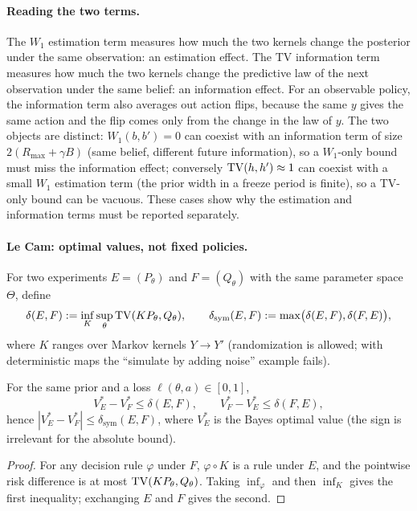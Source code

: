 \paragraph{Reading the two terms.}
The $W_1$ estimation term measures how much the two kernels change the
posterior under the same observation: an estimation effect.  The TV information
term measures how much the two kernels change the predictive law of the next
observation under the same belief: an information effect.  For an observable
policy, the information term also averages out action flips, because the same
$y$ gives the same action and the flip comes only from the change in the law of
$y$.  The two objects are distinct: $W_1(b,b')=0$ can coexist with an
information term of size $2(R_{\max}+\gamma B)$ (same belief, different future
information), so a $W_1$-only bound must miss the information effect; conversely
$\mathrm{TV}(h,h')\approx1$ can coexist with a small $W_1$ estimation term (the prior
width in a freeze period is finite), so a TV-only bound can be vacuous.  These
cases show why the estimation and information terms must be reported separately.

\paragraph{Le Cam: optimal values, not fixed policies.}
\begin{aIIDefLeCam}
For two experiments $E=(P_\theta)$ and $F=(Q_\theta)$ with the same parameter
space $\Theta$, define
\[
\delta(E,F):=\inf_{K}\sup_\theta\mathrm{TV}(KP_\theta,Q_\theta),
\qquad
\delta_{\mathrm{sym}}(E,F):=\max\bigl(\delta(E,F),\delta(F,E)\bigr),
\]
where $K$ ranges over Markov kernels $Y\to Y'$ (randomization is allowed; with
deterministic maps the ``simulate by adding noise'' example fails).
\end{aIIDefLeCam}

\begin{aIILemLeCam}
For the same prior and a loss $\ell(\theta,a)\in[0,1]$,
\[
V_E^*-V_F^*\le\delta(E,F),
\qquad
V_F^*-V_E^*\le\delta(F,E),
\]
hence $|V_E^*-V_F^*|\le\delta_{\mathrm{sym}}(E,F)$, where $V_E^*$ is the Bayes
optimal value (the sign is irrelevant for the absolute bound).
\end{aIILemLeCam}

\begin{proof}
For any decision rule $\varphi$ under $F$, $\varphi\circ K$ is a rule under
$E$, and the pointwise risk difference is at most $\mathrm{TV}(KP_\theta,Q_\theta)$.
Taking $\inf_\varphi$ and then $\inf_K$ gives the first inequality; exchanging
$E$ and $F$ gives the second.
\end{proof}

